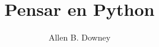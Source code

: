 \documentclass[10pt]{book}
\title{Pensar en Python}
\author{Allen B. Downey}
\newif\ifplastex
\begin{document}
\frontmatter

\ifplastex
    \usepackage{localdef}
    \maketitle

\newcount\anchorcnt
\newcommand*{\Anchor}[1]{%
  \@bsphack%
    \Hy@GlobalStepCount\anchorcnt%
    \edef\@currentHref{anchor.\the\anchorcnt}%
    \Hy@raisedlink{\hyper@anchorstart{\@currentHref}\hyper@anchorend}%
    \M@gettitle{}\label{#1}%
    \@esphack%
}


\else

\newtheorem{exercise}{Ejercicio}[chapter]



\end{document}
